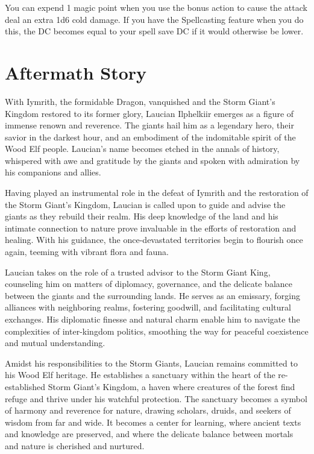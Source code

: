 \documentclass[letterpaper,openany,oneside,twocolumn]{book}
\newcommand{\PATH}{../../}
\begin{document}
You can expend 1 magic point when you use the bonus action to cause the attack deal an extra 1d6 cold damage. If you have the Spellcasting feature when you do this, the DC becomes equal to your spell save DC if it would otherwise be lower.




\chapter*{Aftermath Story}

\entryfont With Iymrith, the formidable Dragon, vanquished and the Storm Giant's Kingdom restored to its former glory, Laucian Ilphelkiir emerges as a figure of immense renown and reverence. The giants hail him as a legendary hero, their savior in the darkest hour, and an embodiment of the indomitable spirit of the Wood Elf people. Laucian's name becomes etched in the annals of history, whispered with awe and gratitude by the giants and spoken with admiration by his companions and allies.

Having played an instrumental role in the defeat of Iymrith and the restoration of the Storm Giant's Kingdom, Laucian is called upon to guide and advise the giants as they rebuild their realm. His deep knowledge of the land and his intimate connection to nature prove invaluable in the efforts of restoration and healing. With his guidance, the once-devastated territories begin to flourish once again, teeming with vibrant flora and fauna.

Laucian takes on the role of a trusted advisor to the Storm Giant King, counseling him on matters of diplomacy, governance, and the delicate balance between the giants and the surrounding lands. He serves as an emissary, forging alliances with neighboring realms, fostering goodwill, and facilitating cultural exchanges. His diplomatic finesse and natural charm enable him to navigate the complexities of inter-kingdom politics, smoothing the way for peaceful coexistence and mutual understanding.

Amidst his responsibilities to the Storm Giants, Laucian remains committed to his Wood Elf heritage. He establishes a sanctuary within the heart of the re-established Storm Giant's Kingdom, a haven where creatures of the forest find refuge and thrive under his watchful protection. The sanctuary becomes a symbol of harmony and reverence for nature, drawing scholars, druids, and seekers of wisdom from far and wide. It becomes a center for learning, where ancient texts and knowledge are preserved, and where the delicate balance between mortals and nature is cherished and nurtured.
\end{document}
